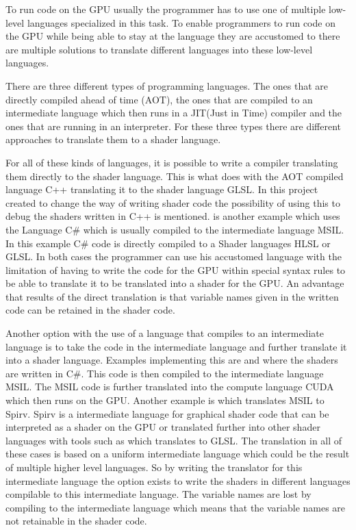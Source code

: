 To run code on the GPU usually the programmer has to use one of  multiple low-level languages specialized in this task. To enable programmers to run code on the GPU while being able to stay at the language they are accustomed to there are multiple solutions to translate different languages into these low-level languages.

There are three different types of programming languages. The ones that are directly compiled ahead of time (AOT), the ones that are compiled to an intermediate language which then runs in a JIT(Just in Time) compiler and the ones that are running in an interpreter. For these three types there are different approaches to translate them to a shader language.

For all of these kinds of languages, it is possible to write a compiler translating them directly to the shader language. This is what  does with the AOT compiled language C++ translating it to the shader language GLSL. In this project created to change the way of writing shader code the possibility of using this to debug the shaders written in C++ is mentioned.  is another example which uses the Language C\# which is usually compiled to the intermediate language MSIL. In this example C\# code is directly compiled to a Shader languages HLSL or GLSL. In both cases the programmer can use his accustomed language with the limitation of having to write the code for the GPU within special syntax rules to be able to translate it to be translated into a shader for the GPU. An advantage that results of the direct translation is that variable names given in the written code can be retained in the shader code.

Another option with the use of a language that compiles to an intermediate language is to take the code in the intermediate language and further translate it into a shader language. Examples implementing this are  and  where the shaders are written in C\#. This code is then compiled to the intermediate language MSIL. The MSIL code is further translated into the compute language CUDA which then runs on the GPU. Another example is  which translates MSIL to Spirv. Spirv is a intermediate language for graphical shader code that can be interpreted as a shader on the GPU or translated further into other shader languages with tools such as  which translates to GLSL. The translation in all of these cases is based on a uniform intermediate language which could be the result of multiple higher level languages. So by writing the translator for this intermediate language the option exists to write the shaders in different languages compilable to this intermediate language. The variable names are lost by compiling to the intermediate language which means that the variable names are not retainable in the shader code.

